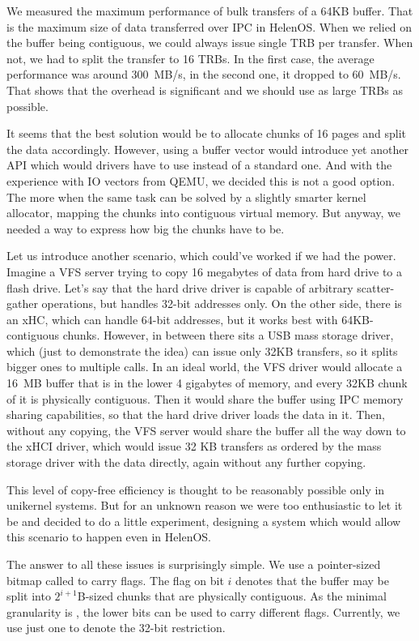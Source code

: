 We measured the maximum performance of bulk transfers of a 64KB buffer. That is
the maximum size of data transferred over IPC in HelenOS. When we relied on the
buffer being contiguous, we could always issue single TRB per transfer. When
not, we had to split the transfer to 16 TRBs. In the first case, the average
performance was around 300~MB/s, in the second one, it dropped to 60~MB/s. That
shows that the overhead is significant and we should use as large TRBs as
possible.

It seems that the best solution would be to allocate chunks of 16 pages and
split the data accordingly. However, using a buffer vector would introduce yet
another API which would drivers have to use instead of a standard one. And with
the experience with IO vectors from QEMU, we decided this is not a good option.
The more when the same task can be solved by a slightly smarter kernel
allocator, mapping the chunks into contiguous virtual memory. But anyway, we
needed a way to express how big the chunks have to be.

Let us introduce another scenario, which could've worked if we had the power.
Imagine a VFS server trying to copy 16 megabytes of data from hard drive to
a flash drive. Let's say that the hard drive driver is capable of arbitrary
scatter-gather operations, but handles 32-bit addresses only. On the other
side, there is an xHC, which can handle 64-bit addresses, but it works best
with 64KB-contiguous chunks. However, in between there sits a USB mass storage
driver, which (just to demonstrate the idea) can issue only 32KB transfers,
so it splits bigger ones to multiple calls. In an ideal world, the VFS driver
would allocate a 16~MB buffer that is in the lower 4 gigabytes of memory, and
every 32KB chunk of it is physically contiguous. Then it would share the buffer
using IPC memory sharing capabilities, so that the hard drive driver loads the
data in it. Then, without any copying, the VFS server would share the buffer
all the way down to the xHCI driver, which would issue 32 KB transfers as
ordered by the mass storage driver with the data directly, again without any
further copying.

This level of copy-free efficiency is thought to be reasonably possible only in
unikernel systems. But for an unknown reason we were too enthusiastic to let
it be and decided to do a little experiment, designing a system which would
allow this scenario to happen even in HelenOS.

The answer to all these issues is surprisingly simple. We use a pointer-sized
bitmap called  to carry flags. The flag on bit $i$ denotes
that the buffer may be split into $2^{i+1}$B-sized chunks that are physically
contiguous. As the minimal granularity is , the lower bits can
be used to carry different flags. Currently, we use just one to denote the
32-bit restriction.

